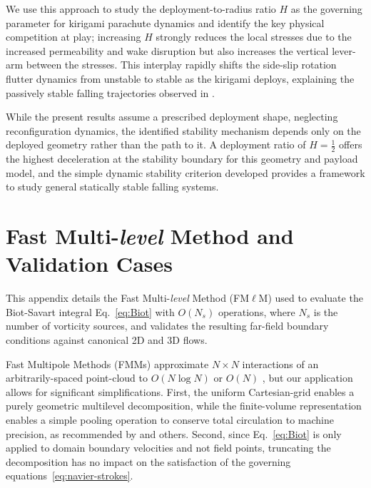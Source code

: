 \documentclass[lineno]{JFM-FLM_Au}
\begin{document}
We use this approach to study the deployment-to-radius ratio $H$ as the governing parameter for kirigami parachute dynamics and identify the key physical competition at play; increasing $H$ strongly reduces the local stresses due to the increased permeability and wake disruption but also increases the vertical lever-arm between the stresses. This interplay rapidly shifts the side-slip rotation flutter dynamics from unstable to stable as the kirigami deploys, explaining the passively stable falling trajectories observed in \cite{Lamoureux2025Kirigami-inspiredReconfiguration}. 

While the present results assume a prescribed deployment shape, neglecting reconfiguration dynamics, the identified stability mechanism depends only on the deployed geometry rather than the path to it. A deployment ratio of $H=\tfrac{1}{2}$ offers the highest deceleration at the stability boundary for this geometry and payload model, and the simple dynamic stability criterion developed provides a framework to study general statically stable falling systems.




\appendix
\section{Fast Multi-\textit{level} Method and Validation Cases}\label{app:validation}

This appendix details the Fast Multi-\textit{level} Method (FM$\ell$M) used to evaluate the Biot-Savart integral Eq.~\ref{eq:Biot} with $O(N_s)$ operations, where $N_s$ is the number of vorticity sources, and validates the resulting far-field boundary conditions against canonical 2D and 3D flows.

Fast Multipole Methods (FMMs) approximate $N \times N$ interactions of an arbitrarily-spaced point-cloud to $O(N\log N)$ or $O(N)$ \citep{Greencard1987ASimulations, Fong2009TheMethod}, but our application allows for significant simplifications. First, the uniform Cartesian-grid enables a purely geometric multilevel decomposition, while the finite-volume representation enables a simple pooling operation to conserve total circulation to machine precision, as recommended by \cite{Colonius2008} and others. Second, since Eq.~\ref{eq:Biot} is only applied to domain boundary velocities and not field points, truncating the decomposition has no impact on the satisfaction of the governing equations~\ref{eq:navier-strokes}. 
\end{document}
